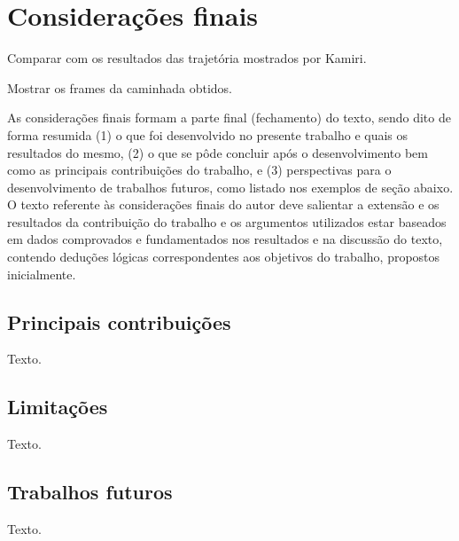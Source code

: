 \chapter{Considerações finais}

\begin{guide}
	Comparar com os resultados das trajetória mostrados por Kamiri.
\end{guide}

\begin{guide}
	Mostrar os frames da caminhada obtidos.
\end{guide}

As considerações finais formam a parte final (fechamento) do texto, sendo dito
de forma resumida (1) o que foi desenvolvido no presente trabalho e quais os
resultados do mesmo, (2) o que se pôde concluir após o desenvolvimento bem como
as principais contribuições do trabalho, e (3) perspectivas para o
desenvolvimento de trabalhos futuros, como listado nos exemplos de seção abaixo.
O texto referente às considerações finais do autor deve salientar a extensão e
os resultados da contribuição do trabalho e os argumentos utilizados estar
baseados em dados comprovados e fundamentados nos resultados e na discussão do
texto, contendo deduções lógicas correspondentes aos objetivos do trabalho,
propostos inicialmente.


\section{Principais contribuições}

Texto.


\section{Limitações}

Texto.


\section{Trabalhos futuros}

Texto.